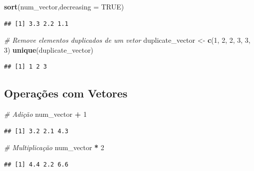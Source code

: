 \documentclass[
]{book}
\newenvironment{Shaded}{\begin{snugshade}}{\end{snugshade}}
\newcommand{\AttributeTok}[1]{\textcolor[rgb]{0.13,0.29,0.53}{#1}}
\newcommand{\CommentTok}[1]{\textcolor[rgb]{0.56,0.35,0.01}{\textit{#1}}}
\newcommand{\ConstantTok}[1]{\textcolor[rgb]{0.56,0.35,0.01}{#1}}
\newcommand{\DecValTok}[1]{\textcolor[rgb]{0.00,0.00,0.81}{#1}}
\newcommand{\FunctionTok}[1]{\textcolor[rgb]{0.13,0.29,0.53}{\textbf{#1}}}
\newcommand{\NormalTok}[1]{#1}
\newcommand{\OtherTok}[1]{\textcolor[rgb]{0.56,0.35,0.01}{#1}}
\newcommand{\SpecialCharTok}[1]{\textcolor[rgb]{0.81,0.36,0.00}{\textbf{#1}}}
\begin{document}
\begin{Shaded}
\begin{Highlighting}[]
\FunctionTok{sort}\NormalTok{(num\_vector,}\AttributeTok{decreasing =} \ConstantTok{TRUE}\NormalTok{)}
\end{Highlighting}
\end{Shaded}

\begin{verbatim}
## [1] 3.3 2.2 1.1
\end{verbatim}

\begin{Shaded}
\begin{Highlighting}[]
\CommentTok{\# Remove elementos duplicados de um vetor}
\NormalTok{duplicate\_vector }\OtherTok{\textless{}{-}} \FunctionTok{c}\NormalTok{(}\DecValTok{1}\NormalTok{, }\DecValTok{2}\NormalTok{, }\DecValTok{2}\NormalTok{, }\DecValTok{3}\NormalTok{, }\DecValTok{3}\NormalTok{, }\DecValTok{3}\NormalTok{)}
\FunctionTok{unique}\NormalTok{(duplicate\_vector)  }
\end{Highlighting}
\end{Shaded}

\begin{verbatim}
## [1] 1 2 3
\end{verbatim}

\subsection{Operações com Vetores}\label{operauxe7uxf5es-com-vetores}

\begin{Shaded}
\begin{Highlighting}[]
\CommentTok{\# Adição}
\NormalTok{num\_vector }\SpecialCharTok{+} \DecValTok{1}  
\end{Highlighting}
\end{Shaded}

\begin{verbatim}
## [1] 3.2 2.1 4.3
\end{verbatim}

\begin{Shaded}
\begin{Highlighting}[]
\CommentTok{\# Multiplicação}
\NormalTok{num\_vector }\SpecialCharTok{*} \DecValTok{2}  
\end{Highlighting}
\end{Shaded}

\begin{verbatim}
## [1] 4.4 2.2 6.6
\end{verbatim}
\end{document}
